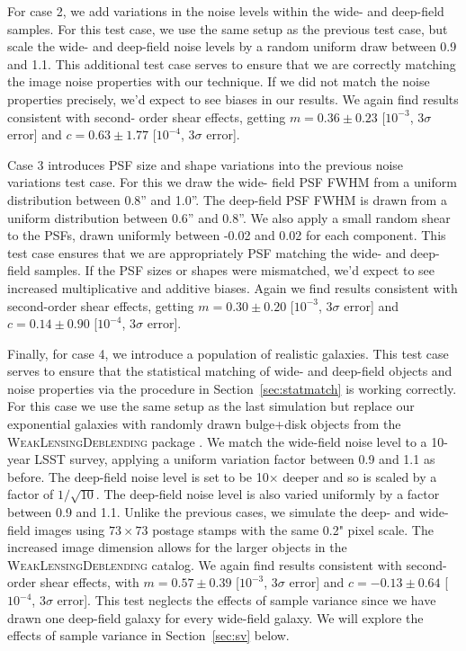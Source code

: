 \documentclass[twocolumn]{openjournal}
\makeatletter
\newcommand{\descwl}{\textsc{WeakLensingDeblending}\@\xspace}
\makeatother
\begin{document}
For case 2, we add variations in the noise levels within the wide- and deep-field
samples. For this test case, we use the same setup as the previous test case, but scale
the wide- and deep-field noise levels by a random uniform draw between 0.9 and 1.1. This
additional test case serves to ensure that we are correctly matching the image noise
properties with our technique. If we did not match the noise properties precisely, we'd
expect to see biases in our results. We again find results consistent with second- order
shear effects, getting $m=0.36\pm0.23$ [$10^{-3}$, $3\sigma$ error] and $c=0.63\pm1.77$
[$10^{-4}$, $3\sigma$ error].

Case 3 introduces PSF size and shape variations into the previous noise variations test
case. For this we draw the wide- field PSF FWHM from a uniform distribution between
0.8'' and 1.0''. The deep-field PSF FWHM is drawn from a uniform distribution between
0.6'' and 0.8''. We also apply a small random shear to the PSFs, drawn uniformly
between -0.02 and 0.02 for each component. This test case ensures that we are appropriately PSF matching the
wide- and deep-field samples. If the PSF sizes or shapes were mismatched, we'd expect to
see increased multiplicative and additive biases. Again we find results consistent with
second-order shear effects, getting $m=0.30\pm0.20$ [$10^{-3}$, $3\sigma$ error] and
$c=0.14\pm0.90$ [$10^{-4}$, $3\sigma$ error].

Finally, for case 4, we introduce a population of realistic galaxies. This test case
serves to ensure that the statistical matching of wide- and deep-field objects and noise
properties via the procedure in Section~\ref{sec:statmatch} is working correctly. For
this case we use the same setup as the last simulation but replace our exponential
galaxies with randomly drawn bulge+disk objects from the \descwl package
\citep{WeakLensingDeblendingPaper,WeakLensingDeblendingSoftware} . We match the
wide-field noise level to a 10-year LSST survey, applying a uniform variation factor
between 0.9 and 1.1 as before. The deep-field noise level is set to be 10$\times$ deeper
and so is scaled by a factor of $1/\sqrt{10}$. The deep-field noise level is also varied
uniformly by a factor between 0.9 and 1.1.
Unlike the previous cases, we simulate the deep-
and wide-field images using $73\times73$ postage stamps with the same 0.2" pixel scale. The increased image dimension allows for the larger objects in the \descwl catalog. We again find results consistent
with second-order shear effects, with $m=0.57\pm0.39$ [$10^{-3}$, $3\sigma$ error] and
$c=-0.13\pm0.64$ [$10^{-4}$, $3\sigma$ error]. This test neglects the effects of sample
variance since we have drawn one deep-field galaxy for every wide-field galaxy. We will
explore the effects of sample variance in Section~\ref{sec:sv} below.
\end{document}
